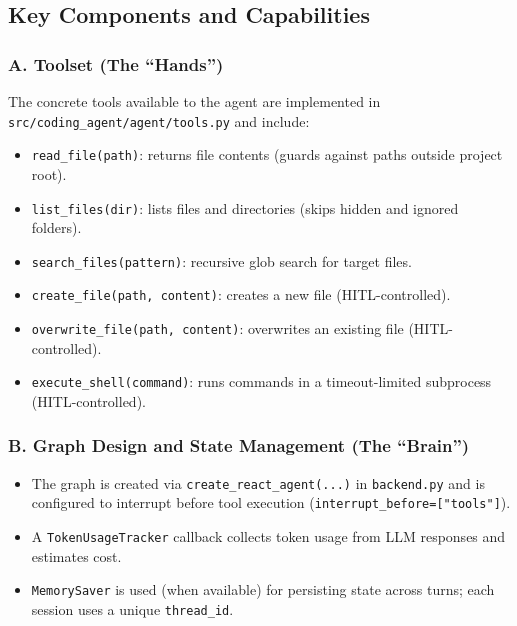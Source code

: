 \documentclass[12pt, a4paper]{article}
\begin{document}
\subsection{Key Components and Capabilities}
\subsubsection{A. Toolset (The ``Hands'')}
The concrete tools available to the agent are implemented in \texttt{src/coding\_agent/agent/tools.py} and include:
\begin{itemize}
  \item \texttt{read\_file(path)}: returns file contents (guards against paths outside project root).
  \item \texttt{list\_files(dir)}: lists files and directories (skips hidden and ignored folders).
  \item \texttt{search\_files(pattern)}: recursive glob search for target files.
  \item \texttt{create\_file(path, content)}: creates a new file (HITL-controlled).
  \item \texttt{overwrite\_file(path, content)}: overwrites an existing file (HITL-controlled).
  \item \texttt{execute\_shell(command)}: runs commands in a timeout-limited subprocess (HITL-controlled).
\end{itemize}

\subsubsection{B. Graph Design and State Management (The ``Brain'')}
\begin{itemize}
  \item The graph is created via \texttt{create\_react\_agent(...)} in \texttt{backend.py} and is configured to interrupt before tool execution (\texttt{interrupt\_before=["tools"]}).
  \item A \texttt{TokenUsageTracker} callback collects token usage from LLM responses and estimates cost.
  \item \texttt{MemorySaver} is used (when available) for persisting state across turns; each session uses a unique \texttt{thread\_id}.
\end{itemize}
\end{document}
